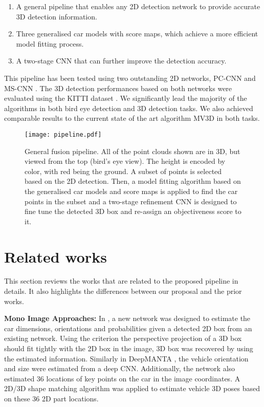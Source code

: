 \documentclass[letterpaper, 10 pt, conference]{ieeeconf}  \usepackage[
\begin{document}
\begin{enumerate}
\item A general pipeline that enables any 2D detection network to provide accurate 3D detection information.
\item Three generalised car models with score maps, which achieve a more efficient model fitting process.
\item A two-stage CNN that can further improve the detection accuracy.
\end{enumerate}

This pipeline has been tested using two outstanding 2D networks, PC-CNN \cite{du2017iros} and MS-CNN \cite{cai2016unified}. The 3D detection performances based on both networks were evaluated using the KITTI dataset \cite{Geiger2012CVPR}. We significantly lead the majority of the algorithms in both bird eye detection and 3D detection tasks. We also achieved comparable results to the current state of the art algorithm MV3D \cite{Chen2017CVPR} in both tasks.

\begin{figure*}[t]
\centering
	 \texttt{[image: pipeline.pdf]}
\caption{General fusion pipeline. All of the point clouds shown are in 3D, but viewed from the top (bird's eye view). The height is encoded by color, with red being the ground. A subset of points is selected based on the 2D detection. Then, a model fitting algorithm based on the generalised car models and score maps is applied to find the car points in the subset and a two-stage refinement CNN is designed to fine tune the detected 3D box and re-assign an objectiveness score to it.}
\label{fig:General fusion pipeline}
\end{figure*}

\section{Related works}
\label{sec:related works}
This section reviews the works that are related to the proposed pipeline in details. It also highlights the differences between our proposal and the prior works.

\textbf{Mono Image Approaches:} In \cite{mousavian20163d}, a new network was designed to estimate the car dimensions, orientations and probabilities given a detected 2D box from an existing network. Using the criterion the perspective projection of a 3D box should fit tightly with the 2D box in the image, 3D box was recovered by using the estimated information. Similarly in DeepMANTA \cite{deepmanta_cvpr17}, the vehicle orientation and size were estimated from a deep CNN. Additionally, the network also estimated 36 locations of key points on the car in the image coordinates. A 2D/3D shape matching algorithm \cite{lepetit2009epnp} was applied to estimate vehicle 3D poses based on these 36 2D part locations. 
\end{document}
